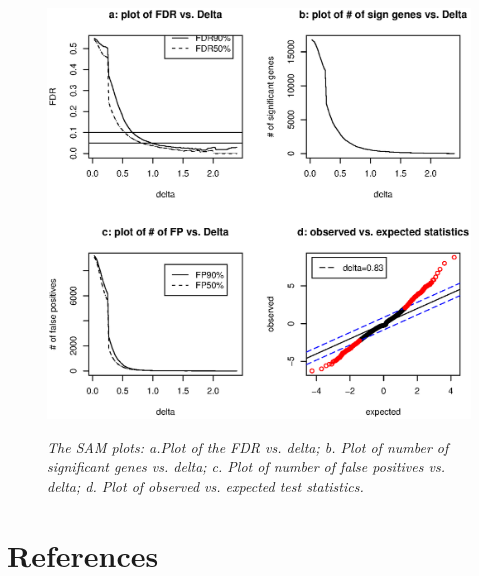 \begin{figure}[!h]
\centering
{\includegraphics[width=.7\textwidth]{SAMPlot.eps}}
\caption{\em {The SAM plots: a.Plot of the FDR vs. delta; b. Plot of number of significant genes vs. delta; c. Plot of 
number of false positives vs. delta; d. Plot of observed vs. expected test statistics.}} \label{IsoBHPlot}
\end{figure}



\section*{References}


